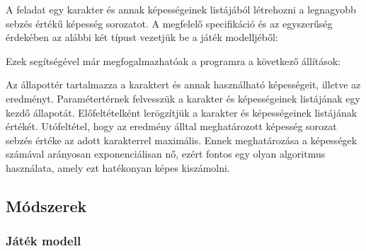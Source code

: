 \documentclass[12pt]{article}
\begin{document}
	A feladat egy karakter és annak képességeinek listájából létrehozni a legnagyobb sebzés értékű képesség sorozatot. A megfelelő specifikáció és az egyszerűség érdekében az alábbi két típust vezetjük be a játék modelljéből:
	
	\vspace{1.5em}
	\noindent{}
	\vspace{1em}
	
	Ezek segítségével már megfogalmazhatóak a programra a következő állítások:
	
	\vspace{1cm}
	\noindent{} \vspace{1em}
	
	Az állapottér tartalmazza a karaktert és annak használható képességeit, illetve az eredményt. Paramétertérnek felvesszük a karakter és képességeinek listájának egy kezdő állapotát.
	Előfeltételként lerögzítjük a karakter és képességeinek listájának értékét.
	Utófeltétel, hogy az eredmény álltal meghatározott képesség sorozat sebzés értéke az adott karakterrel maximális. 
	Ennek meghatározása a képességek számával arányosan exponenciálisan nő, ezért fontos egy olyan algoritmus használata, amely ezt hatékonyan képes kiszámolni.
	
	\subsection{Módszerek}
	
	\subsubsection{Játék modell}
	
\end{document}
